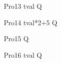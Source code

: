 \begin{circus}
    \circprocess Pro13 \circdef  \lcirctime tval \rcirctime \circstartby Q\\
\end{circus}        

\begin{circus}
   \circprocess Pro14 \circdef \lcirctime tval*2+5 \rcirctime \circstartby Q \\
\end{circus}        

\begin{circus}
    \circprocess Pro15 \circdef  {}  \rcirctime \circstartby Q \\
\end{circus}        

\begin{circus}
    \circprocess Pro16 \circdef  {} \upto tval \rcirctime \circstartby Q \\
\end{circus} 







